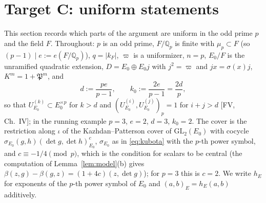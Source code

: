 \documentclass[11pt]{article}
\newcommand{\Q}{\mathbb Q}
\newcommand{\Pfr}{\mathfrak P}
\theoremstyle{plain}
\theoremstyle{definition}
\begin{document}
\section{Target C: uniform statements}\label{sec:targetC}
This section records which parts of the argument are uniform in the
odd prime $p$ and the field $F$.  Throughout: $p$ is an odd prime,
$F/\Q_p$ is finite with $\mu_p\subset F$ (so $(p-1)\mid e:=e(F/\Q_p)$),
$q=|k_F|$, $\varpi$ is a uniformizer, $n=p$, $E_0/F$ is the unramified
quadratic extension, $D=E_0\oplus E_0j$ with $j^2=\varpi$ and
$jx=\sigma(x)j$, $K^m=1+\Pfr^m$, and
\begin{equation}\label{eq:dgen}
 d:=\frac{pe}{p-1},\qquad k_0:=\frac{2e}{p-1}=\frac{2d}{p},
\end{equation}
so that $U^{(k)}_{E_0}\subset E_0^{\times p}$ for $k>d$ and
$(U^{(i)}_{E_0},U^{(j)}_{E_0})_p=1$ for $i+j>d$ [FV, Ch.~IV]; in the
running example $p=3$, $e=2$, $d=3$, $k_0=2$.  The cover is the
restriction along $\iota$ of the Kazhdan--Patterson cover of
$\mathrm{GL}_2(E_0)$ with cocycle $\sigma_{E_0}(g,h)(\det g,\det h)^{c}_{E_0}$,
$\sigma_{E_0}$ as in \eqref{eq:kubota} with the $p$-th power symbol,
and $c\equiv-1/4\pmod p$, which is the condition for scalars to be
central (the computation of Lemma~\ref{lem:model}(b) gives
$\beta(z,g)-\beta(g,z)=(1+4c)(z,\det g)$); for $p=3$ this is $c=2$.  We
write $h_E$ for exponents of the $p$-th power symbol of $E_0$ and
$(a,b)_E=h_E(a,b)$ additively.
\end{document}
